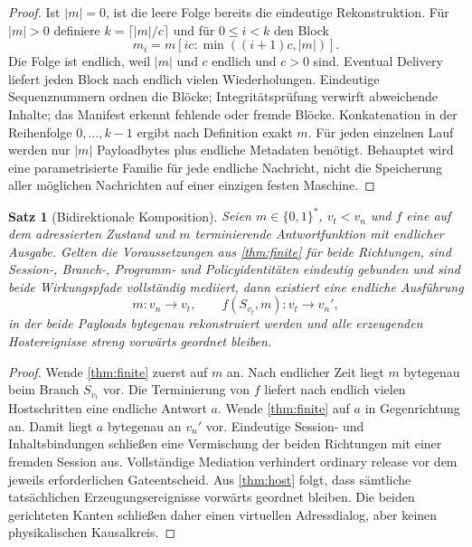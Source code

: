 \documentclass[11pt,a4paper]{article}
\newtheorem{satz}{Satz}[section]
\theoremstyle{remark}
\newcommand{\bytes}{\{0,1\}^{*}}
\begin{document}
\begin{proof}
Ist \(|m|=0\), ist die leere Folge bereits die eindeutige Rekonstruktion. Für
\(|m|>0\) definiere
\(k=\lceil |m|/c\rceil\) und für \(0\leq i<k\) den Block
\[
 m_i=m[ic:\min((i+1)c,|m|)].
\]
Die Folge ist endlich, weil \(|m|\) und \(c\) endlich und \(c>0\) sind.
Eventual Delivery liefert jeden Block nach endlich vielen Wiederholungen.
Eindeutige Sequenznummern ordnen die Blöcke; Integritätsprüfung verwirft
abweichende Inhalte; das Manifest erkennt fehlende oder fremde Blöcke.
Konkatenation in der Reihenfolge \(0,\ldots,k-1\) ergibt nach Definition
exakt \(m\). Für jeden einzelnen Lauf werden nur \(|m|\) Payloadbytes plus
endliche Metadaten benötigt. Behauptet wird eine parametrisierte Familie für
jede endliche Nachricht, nicht die Speicherung aller möglichen Nachrichten
auf einer einzigen festen Maschine.
\end{proof}

\begin{satz}[Bidirektionale Komposition]\label{thm:bidir}
Seien \(m\in\bytes\), \(v_t<v_n\) und \(f\) eine auf dem adressierten
Zustand und \(m\) terminierende Antwortfunktion mit endlicher Ausgabe. Gelten
die Voraussetzungen aus \cref{thm:finite} für beide Richtungen, sind
Session-, Branch-, Programm- und Policyidentitäten eindeutig gebunden und
sind beide Wirkungspfade vollständig mediiert, dann existiert eine endliche
Ausführung
\[
 m:v_n\longrightarrow v_t,
 \qquad
 f(S_{v_t},m):v_t\longrightarrow v_n',
\]
in der beide Payloads bytegenau rekonstruiert werden und alle erzeugenden
Hostereignisse streng vorwärts geordnet bleiben.
\end{satz}

\begin{proof}
Wende \cref{thm:finite} zuerst auf \(m\) an. Nach endlicher Zeit liegt \(m\)
bytegenau beim Branch \(S_{v_t}\) vor. Die Terminierung von \(f\) liefert
nach endlich vielen Hostschritten eine endliche Antwort \(a\). Wende
\cref{thm:finite} auf \(a\) in Gegenrichtung an. Damit liegt \(a\)
bytegenau an \(v_n'\) vor. Eindeutige Session- und Inhaltsbindungen schließen
eine Vermischung der beiden Richtungen mit einer fremden Session aus.
Vollständige Mediation verhindert ordinary release vor dem jeweils
erforderlichen Gateentscheid. Aus \cref{thm:host} folgt, dass sämtliche
tatsächlichen Erzeugungsereignisse vorwärts geordnet bleiben. Die beiden
gerichteten Kanten schließen daher einen virtuellen Adressdialog, aber keinen
physikalischen Kausalkreis.
\end{proof}
\end{document}
